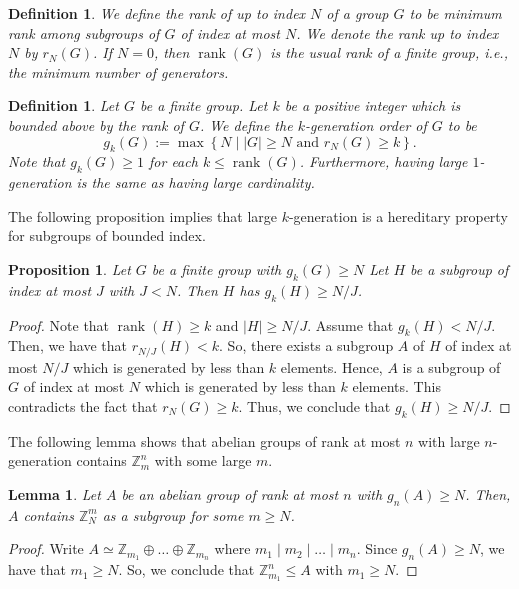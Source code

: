 \documentclass{amsart}
\newcommand{\rank}{\operatorname{rank}}
\newcommand{\zz}{\mathbb{Z}}
\newtheorem{lemma}[theorem]{Lemma}
\newtheorem{proposition}[theorem]{Proposition}
\newtheorem{definition}[theorem]{Definition}
\theoremstyle{remark}
\numberwithin{equation}{section}
\begin{document}
\begin{definition}
{\em 
We define the {\em rank of up to index $N$}
of a group $G$ to be minimum rank among subgroups of $G$ of index at most $N$.
We denote the rank up to index $N$ by $r_N(G)$.
If $N=0$, then $\rank(G)$ is the usual rank of a finite group, i.e.,
the minimum number of generators.
}
\end{definition}

\begin{definition}
{\em 
Let $G$ be a finite group.
Let $k$ be a positive integer which is bounded above by the rank of $G$.
We define the {\em $k$-generation order} of $G$ to be
\[
g_k(G):=
\max\left\{
N \mid |G|\geq N
\text{ and }
r_N(G)\geq k
\right\}.
\]
Note that $g_k(G)\geq 1$ for each $k\leq \rank(G)$.
Furthermore, having large $1$-generation is the same as having large cardinality.
}
\end{definition}

The following proposition implies that large $k$-generation
is a hereditary property for subgroups of bounded index.

\begin{proposition}\label{prop:k-gen-bounded-subgroup}
Let $G$ be a finite group with $g_k(G)\geq N$
Let $H$ be a subgroup of index at most $J$ with $J<N$.
Then $H$ has $g_k(H)\geq N/J$.
\end{proposition}

\begin{proof}
Note that $\rank(H)\geq k$
and $|H|\geq N/J$.
Assume that $g_k(H)<N/J$.
Then, we have that $r_{N/J}(H)<k$.
So, there exists a subgroup $A$ of $H$
of index at most $N/J$ which is generated by less than $k$ elements.
Hence, $A$ is a subgroup of $G$ of index at most $N$
which is generated by less than $k$ elements.
This contradicts the fact that $r_N(G)\geq k$.
Thus, we conclude that $g_k(H)\geq N/J$.
\end{proof}

The following lemma shows that abelian groups of rank at most $n$
with large $n$-generation contains $\zz_m^n$ with some large $m$.

\begin{lemma}\label{lem:bounded-rank-large-k-generation}
Let $A$ be an abelian group of rank at most $n$ 
with $g_n(A)\geq N$.
Then, $A$ contains $\zz_N^m$ as a subgroup
for some $m\geq N$.
\end{lemma}

\begin{proof}
Write $A\simeq \zz_{m_1}\oplus\dots\oplus\zz_{m_n}$
where $m_1\mid m_2\mid \dots \mid m_n$.
Since $g_n(A)\geq N$, we have that 
$m_1\geq N$.
So, we conclude that $\zz_{m_1}^n\leqslant A$ with $m_1\geq N$.
\end{proof}
\end{document}
